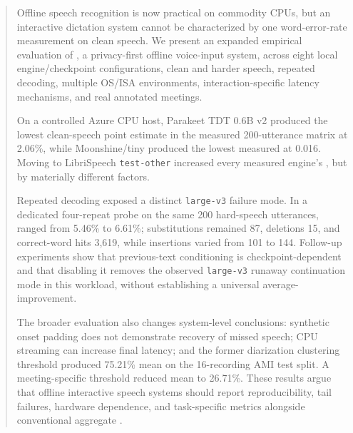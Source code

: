 \begin{abstract}
Offline speech recognition is now practical on commodity CPUs, but an interactive dictation
system cannot be characterized by one word-error-rate measurement on clean speech. We present an
expanded empirical evaluation of \YazSes, a privacy-first offline voice-input system, across
eight local engine/checkpoint configurations, clean and harder speech, repeated decoding,
multiple OS/ISA environments, interaction-specific latency mechanisms, and real annotated
meetings.

On a controlled Azure CPU host, Parakeet TDT 0.6B v2 produced the lowest clean-speech \wer{}
point estimate in the measured 200-utterance matrix at 2.06\%, while Moonshine/tiny produced the
lowest measured \rtf{} at 0.016. Moving to LibriSpeech \texttt{test-other} increased every
measured engine's \wer{}, but by materially different factors.

Repeated decoding exposed a distinct \texttt{large-v3} failure mode. In a dedicated four-repeat
probe on the same 200 hard-speech utterances, \wer{} ranged from 5.46\% to 6.61\%;
substitutions remained 87, deletions 15, and correct-word hits 3,619, while insertions varied
from 101 to 144. Follow-up experiments show that previous-text conditioning is
checkpoint-dependent and that disabling it removes the observed \texttt{large-v3} runaway
continuation mode in this workload, without establishing a universal average-\wer{} improvement.

The broader evaluation also changes system-level conclusions: synthetic onset padding does not
demonstrate recovery of missed speech; CPU streaming can increase final latency; and the former
diarization clustering threshold produced 75.21\% mean \der{} on the 16-recording AMI test split.
A meeting-specific threshold reduced mean \der{} to 26.71\%. These results argue that offline
interactive speech systems should report reproducibility, tail failures, hardware dependence,
and task-specific metrics alongside conventional aggregate \wer{}.
\end{abstract}
